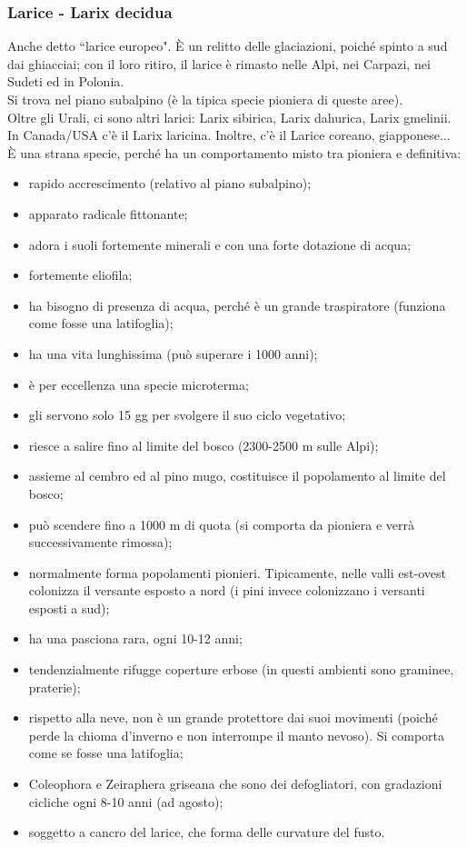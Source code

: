\subsubsection{Larice - Larix decidua}
Anche detto ``larice europeo". È un relitto delle glaciazioni, poiché spinto a sud dai ghiacciai; con il loro ritiro, il larice è rimasto nelle Alpi, nei Carpazi, nei Sudeti ed in Polonia.\\
Si trova nel piano subalpino (è la tipica specie pioniera di queste aree).\\
Oltre gli Urali, ci sono altri larici: Larix sibirica, Larix dahurica, Larix gmelinii. In Canada/USA c'è il Larix laricina. Inoltre, c'è il Larice coreano, giapponese...\\
È una strana specie, perché ha un comportamento misto tra pioniera e definitiva:
\begin{itemize}[nosep]
    \item rapido accrescimento (relativo al piano subalpino);
    \item apparato radicale fittonante;
    \item adora i suoli fortemente minerali e con una forte dotazione di acqua;
    \item fortemente eliofila;
    \item ha bisogno di presenza di acqua, perché è un grande traspiratore (funziona come fosse una latifoglia);
    \item ha una vita lunghissima (può superare i 1000 anni);
    \item è per eccellenza una specie microterma;
    \item gli servono solo 15 gg per svolgere il suo ciclo vegetativo;
    \item riesce a salire fino al limite del bosco (2300-2500 m sulle Alpi);
    \item assieme al cembro ed al pino mugo, costituisce il popolamento al limite del bosco;
    \item può scendere fino a 1000 m di quota (si comporta da pioniera e verrà successivamente rimossa);
    \item normalmente forma popolamenti pionieri. Tipicamente, nelle valli est-ovest colonizza il versante esposto a nord (i pini invece colonizzano i versanti esposti a sud);
    \item ha una pasciona rara, ogni 10-12 anni;
    \item tendenzialmente rifugge coperture erbose (in questi ambienti sono graminee, praterie);
    \item rispetto alla neve, non è un grande protettore dai suoi movimenti (poiché perde la chioma d'inverno e non interrompe il manto nevoso). Si comporta come se fosse una latifoglia;
    \item Coleophora e Zeiraphera griseana che sono dei defogliatori, con gradazioni cicliche ogni 8-10 anni (ad agosto);
    \item soggetto a cancro del larice, che forma delle curvature del fusto. 
\end{itemize}